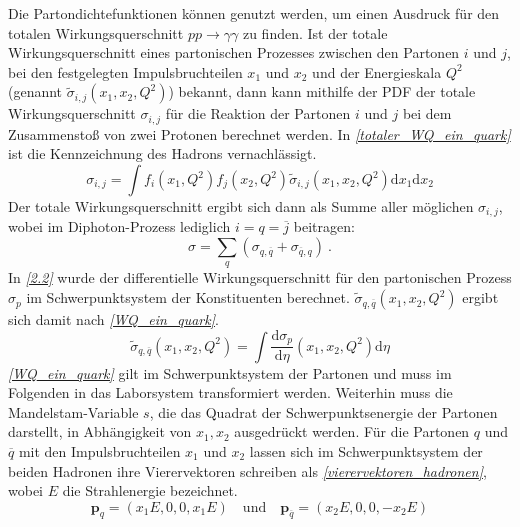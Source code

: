 Die Partondichtefunktionen können genutzt werden, um einen Ausdruck für den totalen Wirkungsquerschnitt $pp \rightarrow \gamma \gamma $ zu finden. Ist der totale Wirkungsquerschnitt eines partonischen Prozesses zwischen den Partonen $i$ und $j$, bei den festgelegten Impulsbruchteilen $x_1$ und $x_2$ und der Energieskala $Q^2$ (genannt $\tilde{\sigma}_{i,j}(x_1, x_2, Q^2)$) bekannt, dann kann mithilfe der PDF der totale Wirkungsquerschnitt $\sigma_{i,j}$ für die Reaktion der Partonen $i$ und $j$ bei dem Zusammenstoß von zwei Protonen berechnet werden. In \textit{\autoref{totaler_WQ_ein_quark}} ist die Kennzeichnung des Hadrons vernachlässigt.  
\begin{equation}
\sigma_{i,j} = \int f_i(x_1, Q^2)f_j(x_2, Q^2) \tilde{\sigma}_{i,j}(x_1, x_2, Q^2)\text{d}x_1\text{d}x_2
\label{totaler_WQ_ein_quark}
\end{equation}
Der totale Wirkungsquerschnitt ergibt sich dann als Summe aller möglichen $\sigma_{i,j}$, wobei im Diphoton-Prozess lediglich $i=q=\overline{j}$ beitragen:  
\begin{equation}
\sigma = \sum_{q} \left(\sigma_{q,\overline{q}} + \sigma_{\overline{q},q} \right)~. 
\label{totaler_WQ_als_summe}
\end{equation}
In \textit{\autoref{2.2}} wurde der differentielle Wirkungsquerschnitt für den partonischen Prozess $\sigma_p$ im Schwerpunktsystem der Konstituenten berechnet. $\tilde{\sigma}_{q,\overline{q}}(x_1, x_2, Q^2)$ ergibt sich damit nach \textit{\autoref{WQ_ein_quark}}.
\begin{equation}
\tilde{\sigma}_{q,\overline{q}}(x_1, x_2, Q^2) = \int \frac{\text{d}\sigma_{p}}{\text{d}\eta}\left(x_1,x_2, Q^2\right)\text{d} \eta
\label{WQ_ein_quark}
\end{equation}
\textit{\autoref{WQ_ein_quark}} gilt im Schwerpunktsystem der Partonen und muss im Folgenden in das Laborsystem transformiert werden. Weiterhin muss die Mandelstam-Variable $s$, die das Quadrat der Schwerpunktsenergie der Partonen darstellt, in Abhängigkeit von $x_1, x_2$ ausgedrückt werden. Für die Partonen $q$ und $\overline{q}$ mit den Impulsbruchteilen $x_1$ und $x_2$ lassen sich im Schwerpunktsystem der beiden Hadronen ihre Vierervektoren schreiben als \textit{\autoref{vierervektoren_hadronen}}, wobei $E$ die Strahlenergie bezeichnet.
\begin{equation}
\textbf{p}_q = \left(x_1E, 0, 0, x_1E\right) \quad \text{und} \quad \textbf{p}_{\overline{q}} = \left(x_2E, 0, 0, -x_2E\right)
\label{vierervektoren_hadronen}
\end{equation}
